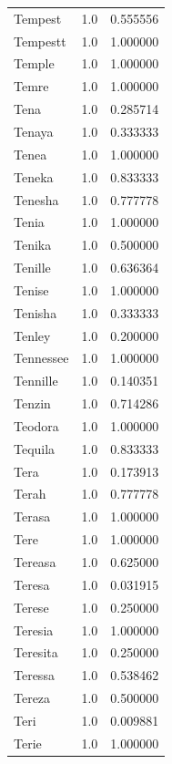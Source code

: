 \documentclass[
  letterpaper,
  DIV=11,
  numbers=noendperiod]{scrreprt}
\begin{document}
\begin{tabular}{lrr}
Tempest         &   1.0 &   0.555556 \\
Tempestt        &   1.0 &   1.000000 \\
Temple          &   1.0 &   1.000000 \\
Temre           &   1.0 &   1.000000 \\
Tena            &   1.0 &   0.285714 \\
Tenaya          &   1.0 &   0.333333 \\
Tenea           &   1.0 &   1.000000 \\
Teneka          &   1.0 &   0.833333 \\
Tenesha         &   1.0 &   0.777778 \\
Tenia           &   1.0 &   1.000000 \\
Tenika          &   1.0 &   0.500000 \\
Tenille         &   1.0 &   0.636364 \\
Tenise          &   1.0 &   1.000000 \\
Tenisha         &   1.0 &   0.333333 \\
Tenley          &   1.0 &   0.200000 \\
Tennessee       &   1.0 &   1.000000 \\
Tennille        &   1.0 &   0.140351 \\
Tenzin          &   1.0 &   0.714286 \\
Teodora         &   1.0 &   1.000000 \\
Tequila         &   1.0 &   0.833333 \\
Tera            &   1.0 &   0.173913 \\
Terah           &   1.0 &   0.777778 \\
Terasa          &   1.0 &   1.000000 \\
Tere            &   1.0 &   1.000000 \\
Tereasa         &   1.0 &   0.625000 \\
Teresa          &   1.0 &   0.031915 \\
Terese          &   1.0 &   0.250000 \\
Teresia         &   1.0 &   1.000000 \\
Teresita        &   1.0 &   0.250000 \\
Teressa         &   1.0 &   0.538462 \\
Tereza          &   1.0 &   0.500000 \\
Teri            &   1.0 &   0.009881 \\
Terie           &   1.0 &   1.000000 \\

\end{tabular}
\end{document}
